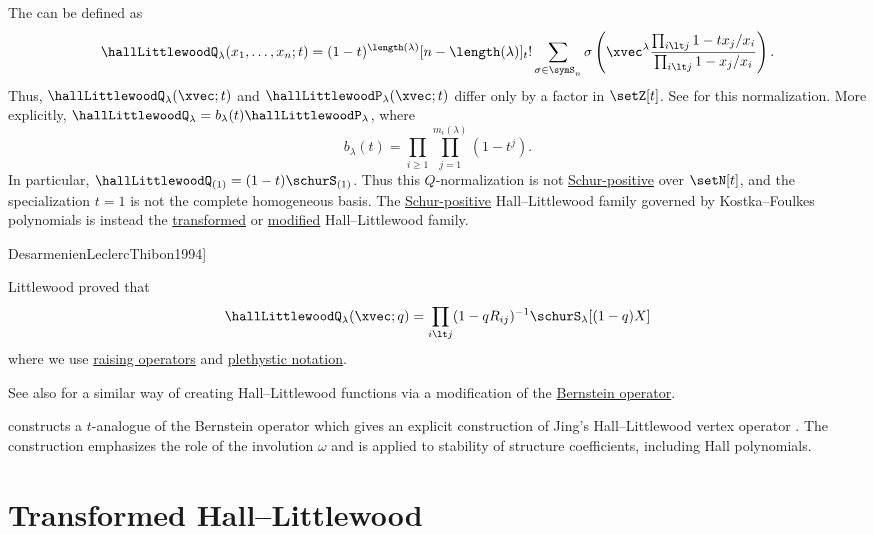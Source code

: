 The \label{hallLittlewoodQPolynomial}
can be defined as
\begin{equation*}
\hallLittlewoodQ_\lambda(x_1,\dotsc,x_n;t)
=
(1-t)^{\length(\lambda)}[n-\length(\lambda)]_t!
\sum_{\sigma \in \symS_n}
\sigma\left(
  \xvec^\lambda
  \frac{\prod_{i \lt j} 1-tx_j/x_i}{\prod_{i \lt j} 1-x_j/x_i}
\right).
\end{equation*}
Thus, $\hallLittlewoodQ_\lambda(\xvec;t)$ and
$\hallLittlewoodP_\lambda(\xvec;t)$ differ only by a factor in $\setZ[t]$.
See \cite[III. \S2]{Macdonald1995} for this normalization.
More explicitly, $\hallLittlewoodQ_\lambda=b_\lambda(t)\hallLittlewoodP_\lambda$,
where
\[
b_\lambda(t)=\prod_{i\geq 1}\prod_{j=1}^{m_i(\lambda)}(1-t^j).
\]
In particular, $\hallLittlewoodQ_{(1)}=(1-t)\schurS_{(1)}$.
Thus this $Q$-normalization is not
\hyperref[schurPositiveDefinition]{Schur-positive} over $\setN[t]$, and
the specialization $t=1$ is not the complete homogeneous basis.  The
\hyperref[schurPositiveDefinition]{Schur-positive} Hall--Littlewood family governed by Kostka--Foulkes
polynomials is instead the \hyperref[hallLittlewoodT]{transformed}
or \hyperref[hallLittlewoodH]{modified} Hall--Littlewood family.


\begin{theorem}[See \cite[Eq.~(17)]{DesarmenienLeclercThibon1994}]

Littlewood proved that
\[
\hallLittlewoodQ_\lambda(\xvec;q)
=
\prod_{i \lt j} (1-qR_{ij})^{-1}\schurS_\lambda[(1-q)X]
\]
where we use \hyperref[schurRaisingFormula]{raising operators} and
\hyperref[plethysm]{plethystic notation}.
\end{theorem}

See also \cite{Jing1991} for a similar way of creating Hall--Littlewood
functions via a modification of the \hyperref[bernsteinOperator]{Bernstein
operator}.

 constructs a $t$-analogue of the Bernstein operator which
gives an explicit construction of Jing's Hall--Littlewood vertex operator
\cite{Graf2025x}.  The construction emphasizes the role of the involution
$\omega$ and is applied to stability of structure coefficients, including
Hall polynomials.


\section[hallLittlewoodT]{Transformed Hall--Littlewood}



